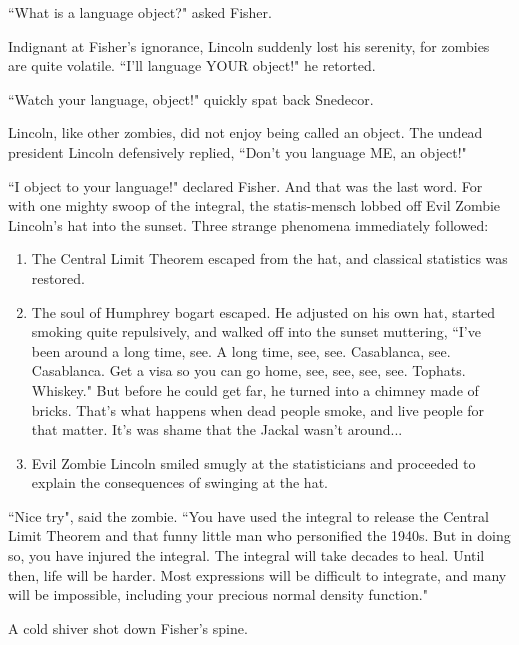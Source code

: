\documentclass{article}
\begin{document}
``What is a language object?" asked Fisher. \newline

Indignant at Fisher's ignorance, Lincoln suddenly lost his serenity, for zombies are quite volatile. ``I'll language YOUR object!" he retorted. \newline

``Watch your language, object!" quickly spat back Snedecor. \newline

Lincoln, like other zombies, did not enjoy being called an object. The undead president Lincoln defensively replied, ``Don't you language ME, an object!" \newline

``I object to your language!" declared Fisher. And that was the last word. For with one mighty swoop of the integral, the statis-mensch lobbed off Evil Zombie Lincoln's hat into the sunset. Three strange phenomena immediately followed: \newline

\begin{enumerate}
\item The Central Limit Theorem escaped from the hat, and classical statistics was restored.
\item The soul of Humphrey bogart escaped. He adjusted on his own hat, started smoking quite repulsively, and walked off into the sunset muttering, ``I've been around a long time, see. A long time, see, see. Casablanca, see. Casablanca. Get a visa so you can go home, see, see, see, see. Tophats. Whiskey." But before he could get far, he turned into a chimney made of bricks. That's what happens when dead people smoke, and live people for that matter. It's was shame that the Jackal wasn't around...
\item Evil Zombie Lincoln smiled smugly at the statisticians and proceeded to explain the consequences of swinging at the hat.
\end{enumerate}

``Nice try", said the zombie. ``You have used the integral to release the Central Limit Theorem and that funny little man who personified the 1940s. But in doing so, you have injured the integral. The integral will take decades to heal. Until then, life will be harder. Most expressions will be difficult to integrate, and many will be impossible, including your precious normal density function."\newline

A cold shiver shot down Fisher's spine. \newline
\end{document}
